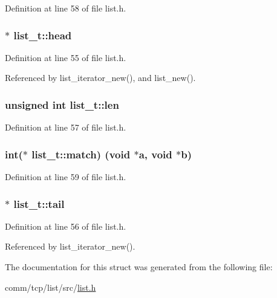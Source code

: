 Definition at line 58 of file list.\+h.

\subsubsection[{\texorpdfstring{head}{head}}]{$\ast$ list\+\_\+t\+::head}\hypertarget{structlist__t_a93ef6d995af96e73e226dc2b8a7232aa}{}\label{structlist__t_a93ef6d995af96e73e226dc2b8a7232aa}


Definition at line 55 of file list.\+h.



Referenced by list\+\_\+iterator\+\_\+new(), and list\+\_\+new().

\subsubsection[{\texorpdfstring{len}{len}}]{\setlength{\rightskip}{0pt plus 5cm}unsigned int list\+\_\+t\+::len}\hypertarget{structlist__t_aba275113a143fe39c162f547c6792502}{}\label{structlist__t_aba275113a143fe39c162f547c6792502}


Definition at line 57 of file list.\+h.

\subsubsection[{\texorpdfstring{match}{match}}]{\setlength{\rightskip}{0pt plus 5cm}int($\ast$ list\+\_\+t\+::match) (void $\ast$a, void $\ast$b)}\hypertarget{structlist__t_a3cf6cc60206869f52386f1f72e161839}{}\label{structlist__t_a3cf6cc60206869f52386f1f72e161839}


Definition at line 59 of file list.\+h.

\subsubsection[{\texorpdfstring{tail}{tail}}]{$\ast$ list\+\_\+t\+::tail}\hypertarget{structlist__t_a45dc80e38f8869f66e5d006117aae5f2}{}\label{structlist__t_a45dc80e38f8869f66e5d006117aae5f2}


Definition at line 56 of file list.\+h.



Referenced by list\+\_\+iterator\+\_\+new().



The documentation for this struct was generated from the following file\+:\begin{DoxyCompactItemize}
\item 
comm/tcp/list/src/\hyperlink{list_8h}{list.\+h}\end{DoxyCompactItemize}

